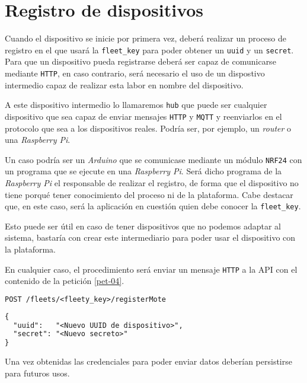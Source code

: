 \section{Registro de dispositivos}

Cuando el dispositivo se inicie por primera vez, deberá realizar un proceso de
registro en el que usará la \texttt{fleet\_key} para poder obtener un
\texttt{uuid} y un \texttt{secret}. Para que un dispositivo pueda registrarse deberá ser capaz de comunicarse
mediante \texttt{HTTP}, en caso contrario, será necesario el uso de un dispostivo
intermedio capaz de realizar esta labor en nombre del dispositivo.

A este dispositivo intermedio lo llamaremos \texttt{hub} que puede ser cualquier
dispositivo que sea capaz de enviar mensajes \texttt{HTTP} y \texttt{MQTT} y
reenviarlos en el protocolo que sea a los dispositivos reales. Podría ser, por
ejemplo, un \emph{router} o una \emph{Raspberry Pi}.

Un caso podría ser un \emph{Arduino} que se comunicase mediante un módulo \texttt{NRF24} con
un programa que se ejecute en una \emph{Raspberry Pi}. Será dicho programa de la
\emph{Raspberry Pi} el responsable de realizar el registro, de forma que el dispositivo no
tiene porqué tener conocimiento del proceso ni de la plataforma. Cabe destacar
que, en este caso, será la aplicación en cuestión quien debe conocer la \texttt{fleet\_key}.

Esto puede ser útil en caso de tener dispositivos que no podemos adaptar al
sistema, bastaría con crear este intermediario para poder usar el dispositivo
con la plataforma.

En cualquier caso, el procedimiento será enviar un mensaje \texttt{HTTP} a la
API con el contenido de la petición \ref{pet-04}.

\begin{minipage}{\textwidth}
\begin{lstlisting}[language=TeX,caption={Registro de dispositivo}, breaklines=true, label=pet-04]
POST /fleets/<fleety_key>/registerMote
\end{lstlisting}
\end{minipage}

\begin{minipage}{\textwidth}
\begin{lstlisting}[language=TeX,caption={Respuesta de registro de dispositivo}, breaklines=true, label=res-03]
{
  "uuid":   "<Nuevo UUID de dispositivo>",
  "secret": "<Nuevo secreto>"
}
\end{lstlisting}
\end{minipage}

Una vez obtenidas las credenciales para poder enviar datos deberían persistirse
para futuros usos.
